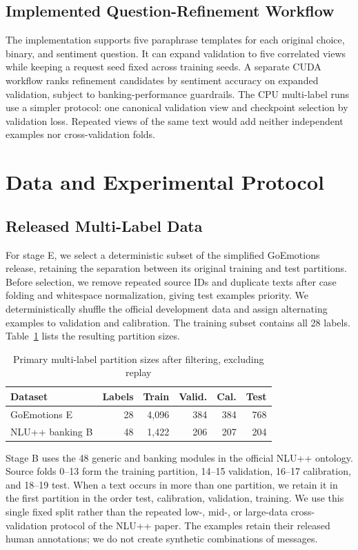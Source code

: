 \documentclass[conference]{IEEEtran}
\begin{document}
\subsection{Implemented Question-Refinement Workflow}
The implementation supports five paraphrase templates for each original choice, binary, and sentiment question. It can expand validation to five correlated views while keeping a request seed fixed across training seeds. A separate CUDA workflow ranks refinement candidates by sentiment accuracy on expanded validation, subject to banking-performance guardrails. The CPU multi-label runs use a simpler protocol: one canonical validation view and checkpoint selection by validation loss. Repeated views of the same text would add neither independent examples nor cross-validation folds.

\section{Data and Experimental Protocol}
\subsection{Released Multi-Label Data}
For stage E, we select a deterministic subset of the simplified GoEmotions release, retaining the separation between its original training and test partitions. Before selection, we remove repeated source IDs and duplicate texts after case folding and whitespace normalization, giving test examples priority. We deterministically shuffle the official development data and assign alternating examples to validation and calibration. The training subset contains all 28 labels. Table~\ref{tab:partitions} lists the resulting partition sizes.

\begin{table}[!t]
\caption{Primary multi-label partition sizes after filtering, excluding replay}
\label{tab:partitions}
\centering\footnotesize\setlength{\tabcolsep}{3.5pt}
\begin{tabular}{lrrrrr}\toprule
Dataset & Labels & Train & Valid. & Cal. & Test\\\midrule
GoEmotions E & 28 & 4,096 & 384 & 384 & 768\\
NLU++ banking B & 48 & 1,422 & 206 & 207 & 204\\\bottomrule
\end{tabular}
\end{table}

Stage B uses the 48 generic and banking modules in the official NLU++ ontology. Source folds 0--13 form the training partition, 14--15 validation, 16--17 calibration, and 18--19 test. When a text occurs in more than one partition, we retain it in the first partition in the order test, calibration, validation, training. We use this single fixed split rather than the repeated low-, mid-, or large-data cross-validation protocol of the NLU++ paper. The examples retain their released human annotations; we do not create synthetic combinations of messages.
\end{document}
